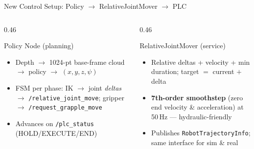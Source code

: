 \documentclass[aspectratio=169]{beamer}
\newenvironment{tightitemize}{
  \begin{itemize}\setlength{\itemsep}{3pt}\setlength{\parskip}{0pt}}{\end{itemize}}
\begin{document}
\begin{frame}{New Control Setup: Policy $\to$ RelativeJointMover $\to$ PLC}
\begin{center}
{%
}
\end{center}
\begin{columns}[t,totalwidth=\textwidth]
  \begin{column}{0.46\textwidth}
    \begin{block}{Policy Node (planning)}
      \scriptsize
      \begin{tightitemize}
        \item Depth $\to$ 1024-pt base-frame cloud $\to$ policy $\to$ $(x,y,z,\psi)$
        \item FSM per phase: IK $\to$ joint \emph{deltas} $\to$ \texttt{/relative\_joint\_move}; gripper $\to$ \texttt{/request\_grapple\_move}
        \item Advances on \texttt{/plc\_status} (HOLD/EXECUTE/END)
      \end{tightitemize}
    \end{block}
  \end{column}
  \begin{column}{0.46\textwidth}
    \begin{block}{RelativeJointMover (service)}
      \scriptsize
      \begin{tightitemize}
        \item Relative deltas + velocity + min duration; target $=$ current $+$ delta
        \item \textbf{7th-order smoothstep} (zero end velocity \& acceleration) at 50\,Hz --- hydraulic-friendly
        \item Publishes \texttt{RobotTrajectoryInfo}; same interface for sim \& real
      \end{tightitemize}
    \end{block}
  \end{column}
\end{columns}
\end{frame}
\end{document}
